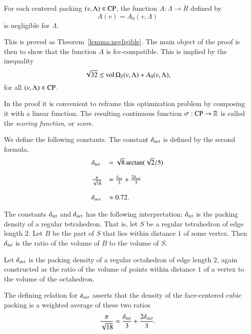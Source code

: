 \begin{theorem}\label{lemma:negligible'}
For each centered packing $(v,\Lambda)\in{\operatorname{CP}}$, the
function $A:\Lambda\to\ring{R}$ defined by
   $$A(v)= A_0(v,\Lambda)$$
is negligible for $\Lambda$.
\end{theorem}

This is proved as Theorem~\ref{lemma:negligible}.  The main object
of the proof is then to show that the function $A$ is
fcc-compatible. This is implied by the inequality
      \begin{equation}
      \sqrt{32}\le{\operatorname{vol}}\,\Omega_2(v,\Lambda)+ A_0(v,\Lambda),
      \label{eqn:32}
      \end{equation}
for all $(v,\Lambda)\in{\operatorname{CP}}$.

In the proof it is convenient to reframe this optimization problem
by composing it with a linear function.  The resulting continuous
function $\sigma:{\operatorname{CP}}\to\mathbb{R}$ is called the
  {\it scoring function}, or {\it score}.

\begin{definition}\label{def:dtet}  We define the following
constants.  The constant $\delta_{oct}$ is defined by the second formula.
    $$\begin{array}{lll}
      \delta_{tet} &= \sqrt{8} \arctan(\sqrt{2}/5)\\
      \\
      \frac{\pi}{\sqrt{18}} &= \frac{\delta_{tet}}{3} + \frac{2
      \delta_{oct}}{3}\\
      \\
      \delta_{oct} & \approx 0.72.
      \end{array}
    $$
\end{definition}

\begin{remark}  The constants $\delta_{tet}$ and $\delta_{oct}$ has the
following interpretation:  $\delta_{tet}$ is
the packing density of a regular tetrahedron. That is, let $S$ be
a regular tetrahedron of edge length $2$.  Let $B$ be the part of
$S$ that lies within distance $1$ of some vertex. Then $\delta_{tet}$ is
the ratio of the volume of $B$ to the volume of $S$.

Let $\delta_{oct}$ is the packing density of a
regular octahedron of edge length $2$, again constructed as the
ratio of the volume of points within distance $1$ of a vertex to
the volume of the octahedron.
\end{remark}

\begin{remark}
The defining relation for $\delta_{oct}$ asserts that the density of the
face-centered cubic packing is a weighted average of these two
ratios
    $$\frac{\pi}{\sqrt{18}} = \frac{\delta_{tet}}{3} + \frac{2 \delta_{oct}}{3}.$$
\end{remark}


